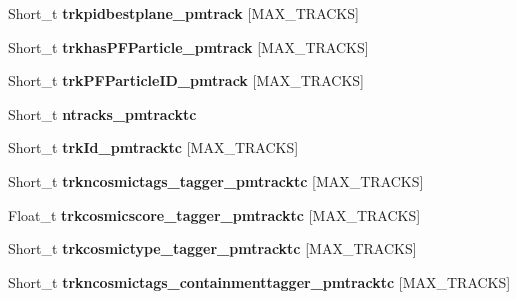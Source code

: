 \begin{DoxyCompactItemize}
\item 
\hypertarget{classanatree_a827791670ea65487df9280db799a0714}{Short\-\_\-t {\bfseries trkpidbestplane\-\_\-pmtrack} \mbox{[}M\-A\-X\-\_\-\-T\-R\-A\-C\-K\-S\mbox{]}}\label{classanatree_a827791670ea65487df9280db799a0714}

\item 
\hypertarget{classanatree_a17dccc2e1e357a4d48a853c3c60ec308}{Short\-\_\-t {\bfseries trkhas\-P\-F\-Particle\-\_\-pmtrack} \mbox{[}M\-A\-X\-\_\-\-T\-R\-A\-C\-K\-S\mbox{]}}\label{classanatree_a17dccc2e1e357a4d48a853c3c60ec308}

\item 
\hypertarget{classanatree_a61630bb94d8e1768ff39596d01148676}{Short\-\_\-t {\bfseries trk\-P\-F\-Particle\-I\-D\-\_\-pmtrack} \mbox{[}M\-A\-X\-\_\-\-T\-R\-A\-C\-K\-S\mbox{]}}\label{classanatree_a61630bb94d8e1768ff39596d01148676}

\item 
\hypertarget{classanatree_afd766c2df1e61b45c609cf32c5f937d1}{Short\-\_\-t {\bfseries ntracks\-\_\-pmtracktc}}\label{classanatree_afd766c2df1e61b45c609cf32c5f937d1}

\item 
\hypertarget{classanatree_a6d982a56ff1941dd94ae04696f063fda}{Short\-\_\-t {\bfseries trk\-Id\-\_\-pmtracktc} \mbox{[}M\-A\-X\-\_\-\-T\-R\-A\-C\-K\-S\mbox{]}}\label{classanatree_a6d982a56ff1941dd94ae04696f063fda}

\item 
\hypertarget{classanatree_a504bc60d1d1f1403c9625a7ea8b6358b}{Short\-\_\-t {\bfseries trkncosmictags\-\_\-tagger\-\_\-pmtracktc} \mbox{[}M\-A\-X\-\_\-\-T\-R\-A\-C\-K\-S\mbox{]}}\label{classanatree_a504bc60d1d1f1403c9625a7ea8b6358b}

\item 
\hypertarget{classanatree_a1fb10c3b5cdfe58d35cb63137d612acc}{Float\-\_\-t {\bfseries trkcosmicscore\-\_\-tagger\-\_\-pmtracktc} \mbox{[}M\-A\-X\-\_\-\-T\-R\-A\-C\-K\-S\mbox{]}}\label{classanatree_a1fb10c3b5cdfe58d35cb63137d612acc}

\item 
\hypertarget{classanatree_a2ef4e92edce03e3bf308d76de20a66a8}{Short\-\_\-t {\bfseries trkcosmictype\-\_\-tagger\-\_\-pmtracktc} \mbox{[}M\-A\-X\-\_\-\-T\-R\-A\-C\-K\-S\mbox{]}}\label{classanatree_a2ef4e92edce03e3bf308d76de20a66a8}

\item 
\hypertarget{classanatree_a674aee8b1707f77ced823e4cf79ddcc5}{Short\-\_\-t {\bfseries trkncosmictags\-\_\-containmenttagger\-\_\-pmtracktc} \mbox{[}M\-A\-X\-\_\-\-T\-R\-A\-C\-K\-S\mbox{]}}\label{classanatree_a674aee8b1707f77ced823e4cf79ddcc5}


\end{DoxyCompactItemize}
